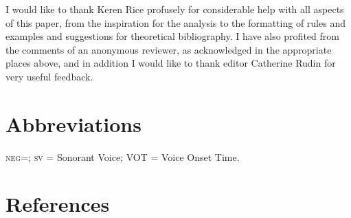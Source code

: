 \documentclass[output=paper]{LSP/langsci}
\begin{document}
I would like to thank Keren Rice profusely for considerable help with all aspects of this paper, from the inspiration for the analysis to the formatting of rules and examples and suggestions for theoretical bibliography. I have also profited from the comments of an anonymous reviewer, as acknowledged in the appropriate places above, and in addition I would like to thank editor Catherine Rudin for very useful feedback.

\section*{Abbreviations}
\textsc{neg}=; \textsc{sv} = Sonorant Voice; VOT = Voice Onset Time.

\section*{References}

\printbibliography[heading=subbibliography,notkeyword=this]
 
\end{document}
